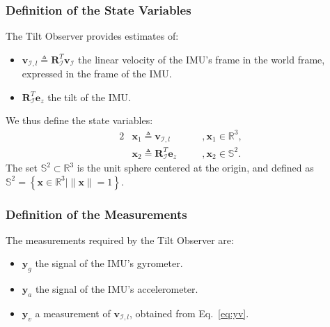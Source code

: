 \documentclass{IJCAS}
\begin{document}
\subsubsection{Definition of the State Variables}
The Tilt Observer provides estimates of: 
\begin{itemize}[leftmargin=0em]
    \item $\boldsymbol{v}_{\mathcal{I}, l} \triangleq \boldsymbol{R}^{T}_{\mathcal{I}} \boldsymbol{v}_{\mathcal{I}} $ the linear velocity of the IMU's frame in the world frame, expressed in the frame of the IMU.
    \item $\boldsymbol{R}^{T}_{\mathcal{I}} \boldsymbol{e}_z$ the tilt of the IMU.
\end{itemize}
We thus define the state variables: 
\begin{alignat}{2}
&\boldsymbol{x}_{1} \triangleq \boldsymbol{v}_{\mathcal{I}, l} \quad &&, \boldsymbol{x}_{1} \in \mathbb{R}^{3}, \label{eq:x1} \\
&\boldsymbol{x}_{2} \triangleq \boldsymbol{R}^{T}_{\mathcal{I}} \boldsymbol{e}_z \quad &&, \boldsymbol{x}_{2} \in \mathbb{S}^{2}. \label{eq:x2}
\end{alignat} 
The set $\mathbb{S}^{2} \subset \mathbb{R}^{3}$ is the unit sphere centered at the origin, and defined as $\mathbb{S}^{2} = \left\{ \boldsymbol{x} \in \mathbb{R}^{3} \vert \lVert \boldsymbol{x} \rVert=1 \right\}$.


\subsubsection{Definition of the Measurements} \label{subsec:tiltMeas}
The measurements required by the Tilt Observer are:
\begin{itemize}[itemsep=0pt, parsep=0.5pt, leftmargin=0em]
    \item $\boldsymbol{y}_{g}$ the signal of the IMU's gyrometer.
    \item $\boldsymbol{y}_{a}$ the signal of the IMU's accelerometer.
    \item $\boldsymbol{y}_{v}$ a measurement of $\boldsymbol{v}_{\mathcal{I}, l}$, obtained from Eq.~\eqref{eq:yv}.
\end{itemize}
\end{document}
